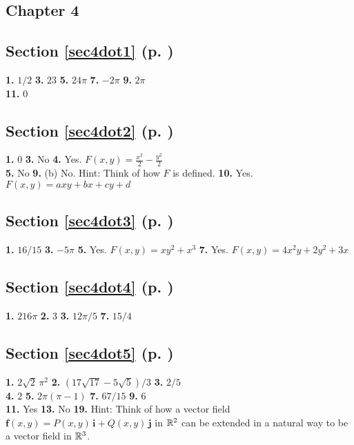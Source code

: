 \begin{multicols}{2}
\section*{Chapter 4}
\subsection*{Section \ref{sec4dot1} (p. \pageref{sec4dot1})}
\textbf{1.} $1/2$\quad
\textbf{3.} $23$\quad
\textbf{5.} $24\pi$\quad
\textbf{7.} $-2\pi$\quad
\textbf{9.} $2\pi$\\\textbf{11.} $0$
\subsection*{Section \ref{sec4dot2} (p. \pageref{sec4dot2})}
\textbf{1.} $0$\quad
\textbf{3.} No\quad
\textbf{4.} Yes. $F(x,y)=\frac{x^2}{2}-\frac{y^2}{2}$\\
\textbf{5.} No\quad
\textbf{9.} (b) No. Hint: Think of how $F$ is defined.\quad
\textbf{10.} Yes. $F(x,y)=axy+bx+cy+d$
\subsection*{Section \ref{sec4dot3} (p. \pageref{sec4dot3})}
\textbf{1.} $16/15$\quad
\textbf{3.} $-5\pi$\quad
\textbf{5.} Yes. $F(x,y)=xy^2 + x^3$\quad
\textbf{7.} Yes. $F(x,y)=4x^2 y + 2y^2 + 3x$
\subsection*{Section \ref{sec4dot4} (p. \pageref{sec4dot4})}
\textbf{1.} $216\pi$\quad
\textbf{2.} $3$\quad
\textbf{3.} $12\pi/5$\quad
\textbf{7.} $15/4$
\subsection*{Section \ref{sec4dot5} (p. \pageref{sec4dot5})}
\textbf{1.} $2\sqrt{2}\,\pi^2$\quad
\textbf{2.} $(17\sqrt{17} - 5\sqrt{5})/3$\quad
\textbf{3.} $2/5$\\
\textbf{4.} $2$ \quad
\textbf{5.} $2\pi (\pi - 1)$ \quad
\textbf{7.} $67/15$ \quad
\textbf{9.} $6$\\
\textbf{11.} Yes \quad
\textbf{13.} No \quad
\textbf{19.} Hint: Think of how a vector field $\textbf{f}(x,y) = P(x,y)\,\textbf{i} + Q(x,y)\,\textbf{j}$ in
$\mathbb{R}^{2}$ can be extended in a natural way to be a vector field in $\mathbb{R}^{3}$.

\end{multicols}

